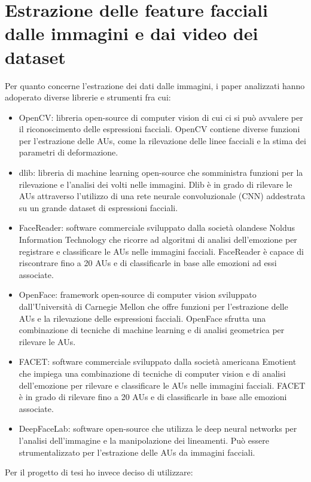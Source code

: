\section{Estrazione delle feature facciali dalle immagini e dai video dei dataset}
Per quanto concerne l’estrazione dei dati dalle immagini, i paper analizzati hanno adoperato diverse librerie e strumenti fra cui:
\begin{itemize}
    \item OpenCV: libreria open-source di computer vision di cui ci si può avvalere per il riconoscimento delle espressioni facciali. OpenCV contiene diverse funzioni per l'estrazione delle AUs, come la rilevazione delle linee facciali e la stima dei parametri di deformazione.
    \item dlib: libreria di machine learning open-source che somministra funzioni per la rilevazione e l'analisi dei volti nelle immagini. Dlib è in grado di rilevare le AUs attraverso l'utilizzo di una rete neurale convoluzionale (CNN) addestrata su un grande dataset di espressioni facciali.
    \item FaceReader: software commerciale sviluppato dalla società olandese Noldus Information Technology che ricorre ad algoritmi di analisi dell'emozione per registrare e classificare le AUs nelle immagini facciali. FaceReader è capace di riscontrare fino a 20 AUs e di classificarle in base alle emozioni ad essi associate.
    \item OpenFace: framework open-source di computer vision sviluppato dall'Università di Carnegie Mellon che offre funzioni per l'estrazione delle AUs e la rilevazione delle espressioni facciali. OpenFace sfrutta una combinazione di tecniche di machine learning e di analisi geometrica per rilevare le AUs.
    \item FACET: software commerciale sviluppato dalla società americana Emotient che impiega una combinazione di tecniche di computer vision e di analisi dell'emozione per rilevare e classificare le AUs nelle immagini facciali. FACET è in grado di rilevare fino a 20 AUs e di classificarle in base alle emozioni associate.
    \item DeepFaceLab: software open-source che utilizza le deep neural networks per l'analisi dell'immagine e la manipolazione dei lineamenti. Può essere strumentalizzato per l'estrazione delle AUs da immagini facciali. 
\end{itemize}

Per il progetto di tesi ho invece deciso di utilizzare:

